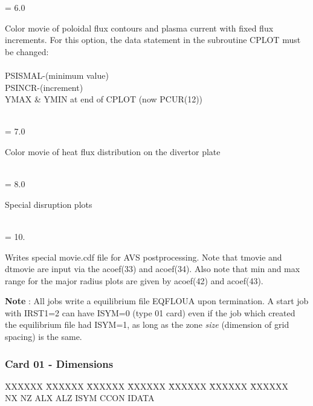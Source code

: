 \begin{tabbing}
             \> = 6.0 \> \parbox[t]{\width}{ Color movie of poloidal flux contours and plasma current with
fixed flux increments.  For this option, the data statement in the subroutine CPLOT must be
changed: \\
 \\
PSISMAL-(minimum value)\\
PSINCR-(increment)\\
YMAX \& YMIN at end of CPLOT (now PCUR(12)) \\
} \\ 
             \> = 7.0 \> \parbox[t]{\width}{ Color movie of heat flux distribution on the divertor
plate} \\
             \> = 8.0 \> \parbox[t]{\width}{ Special disruption plots} \\
             \> = 10.   \> \parbox[t]{\width}{ Writes special movie.cdf 
            file for AVS postprocessing.  Note that tmovie and dtmovie are 
            input via the acoef(33) and acoef(34).  Also note that min and
            max range for the major radius plots are given by acoef(42) and
            acoef(43).}
\end{tabbing}
{\bf Note} : All jobs write a equilibrium file EQFLOUA upon termination.  A start job with
IRST1=2 can have ISYM=0 (type 01 card) even if the job which created the equilibrium file had
ISYM=1, as long as the zone {\em size} (dimension of grid spacing) is the same.
\newpage \subsubsection{Card 01 - Dimensions} 
\begin{tabbing} 
XXXXXX \= XXXXXX \= XXXXXX \= XXXXXX \= XXXXXX \= XXXXXX \=
XXXXXX        \\ 
\footnotesize NX \>\footnotesize NZ \>\footnotesize ALX \>\footnotesize ALZ \>\footnotesize
ISYM \>\footnotesize CCON \>\footnotesize IDATA 
\end{tabbing}
